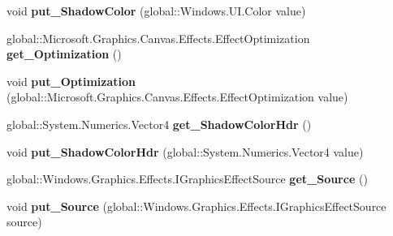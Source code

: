 \begin{DoxyCompactItemize}
\item 
\mbox{\label{class_microsoft_1_1_graphics_1_1_canvas_1_1_effects_1_1_shadow_effect_ace9e753564ded7c048bec73be26b3136}} 
void {\bfseries put\+\_\+\+Shadow\+Color} (global\+::\+Windows.\+U\+I.\+Color value)
\item 
\mbox{\label{class_microsoft_1_1_graphics_1_1_canvas_1_1_effects_1_1_shadow_effect_a79e6fe830147ee5d2fc99f933916a815}} 
global\+::\+Microsoft.\+Graphics.\+Canvas.\+Effects.\+Effect\+Optimization {\bfseries get\+\_\+\+Optimization} ()
\item 
\mbox{\label{class_microsoft_1_1_graphics_1_1_canvas_1_1_effects_1_1_shadow_effect_ae516e5cfdeacbc1ea31669a53415a11c}} 
void {\bfseries put\+\_\+\+Optimization} (global\+::\+Microsoft.\+Graphics.\+Canvas.\+Effects.\+Effect\+Optimization value)
\item 
\mbox{\label{class_microsoft_1_1_graphics_1_1_canvas_1_1_effects_1_1_shadow_effect_af69aa0225a7b96c1ff39ea116af417b7}} 
global\+::\+System.\+Numerics.\+Vector4 {\bfseries get\+\_\+\+Shadow\+Color\+Hdr} ()
\item 
\mbox{\label{class_microsoft_1_1_graphics_1_1_canvas_1_1_effects_1_1_shadow_effect_a6cbf0da6741b9951835c9e913616a2bc}} 
void {\bfseries put\+\_\+\+Shadow\+Color\+Hdr} (global\+::\+System.\+Numerics.\+Vector4 value)
\item 
\mbox{\label{class_microsoft_1_1_graphics_1_1_canvas_1_1_effects_1_1_shadow_effect_adb562a703cac7d7a98d0a4a852aabc7e}} 
global\+::\+Windows.\+Graphics.\+Effects.\+I\+Graphics\+Effect\+Source {\bfseries get\+\_\+\+Source} ()
\item 
\mbox{\label{class_microsoft_1_1_graphics_1_1_canvas_1_1_effects_1_1_shadow_effect_aa24f56aac89433bb8ba29589ad881cf7}} 
void {\bfseries put\+\_\+\+Source} (global\+::\+Windows.\+Graphics.\+Effects.\+I\+Graphics\+Effect\+Source source)

\end{DoxyCompactItemize}
